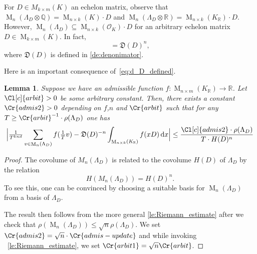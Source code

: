 \documentclass{amsart}
\newtheorem{lemma}[theorem]{Lemma}
\theoremstyle{definition}
\theoremstyle{remark}
\newcommand{\OK}{\mathcal{O}_K}
\newcommand{\KR}{K_\mathbb{R}}
\newcommand{\diff}{\,\mathrm{d}}
\DeclareMathOperator{\M}{M}
\begin{document}
For $D \in M_{k \times m}(K)$ an echelon matrix,
observe that $\M_{n}(\Lambda_D \otimes \mathbb{Q}) = \M_{n \times k}(K) \cdot D$ 
and $\M_{n}(\Lambda_{D} \otimes \mathbb{R}) = \M_{n \times k}(K_\mathbb{R}) \cdot D$. 
However, $\M_n(\Lambda_D) \subseteq  \M_{n \times k}(\OK) \cdot D$ for an arbitrary echelon matrix $D \in \M_{k \times m}(K)$. In fact, 
\begin{equation}
    [\M_{n \times k}(\OK)  D : \M_{n}(\Lambda_{D})] = \mathfrak{D}(D)^{n},
    \label{eq:denominator_index}
\end{equation}
where $\mathfrak{D}(D)$ is defined in \cref{de:denonimator}.

Here is an important consequence of~\cref{eq:d_D_defined}.
\begin{lemma}
    \label{le:without_rank_cond}
    Suppose we have an admissible function $f: \M_{n \times m}(\KR) \rightarrow  \mathbb{R}$. 
    Let $\Cl[c]{arbit}>0$ be some arbitrary constant.
    Then, there exists a constant $\Cr{admis2} > 0$ depending on $f$,$n$ and $\Cr{arbit}$ 
    such that for any $T   \geq \Cr{arbit}^{-1}  \cdot \rho(\Lambda_{D})$ one has
    \begin{equation}
        \Big| \tfrac{1}{T^{knd}}\sum_{v \in \M_{n}(\Lambda_{D})}^{} f(\tfrac{1}{T}v) -  \mathfrak{D}(D)^{-n} \int_{\M_{n \times k}(\KR)}^{} f(xD)\diff x \Big| \leq \frac{ \Cl[c]{admis2} \cdot \rho(\Lambda_{D})}{T \cdot H({D})^{n}}
    \end{equation}
\end{lemma}
\begin{proof}
    The covolume of $M_n(\Lambda_D)$ is related to the covolume $H(D)$ of $\Lambda_D$ by the relation 
    $$H(M_n(\Lambda_D))=H(D)^n.$$
    To see this, one can be convinced by choosing a suitable basis for $\M_n(\Lambda_D)$ from a basis of $\Lambda_D$.

    The result then follows from the more general \cref{le:Riemann_estimate} 
    after we check that $\rho(\M_{n}(\Lambda_{D})) \leq \sqrt{n} \rho(\Lambda_{D})$. 
    We set $\Cr{admis2} = \sqrt{n }\cdot \Cr{admis-update}$ and while invoking ~\cref{le:Riemann_estimate}, we set $\Cr{arbit1} = \sqrt{n}\Cr{arbit}$.
\end{proof}
\end{document}
